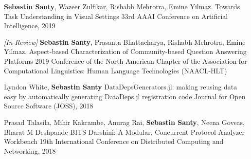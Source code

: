%
%
%


\begin{publications}
	\publication
	{\textbf{Sebastin Santy}, Wazeer Zulfikar, Rishabh Mehrotra, Emine Yilmaz.}
	{Towards Task Understanding in Visual Settings}
	{33rd AAAI Conference on Artificial Intelligence, 2019}
	
	\publication
	{\textit{[In-Review]} \textbf{Sebastin Santy}, Prasanta Bhattacharya, Rishabh Mehrotra, Emine Yilmaz.}
	{Aspect-based Characterization of Community-based Question Answering Platforms}
	{2019 Conference of the North American Chapter of the Association for Computational Linguistics: Human Language Technologies (NAACL-HLT)}
	
	\publication
	{Lyndon White, \textbf{Sebastin Santy}}
	{DataDepsGenerators.jl: making reusing data easy by automatically generating DataDeps.jl registration code}
	{Journal for Open Source Software (JOSS), 2018}
	
	\publication
	{Prasad Talasila, Mihir Kakrambe, Anurag Rai, \textbf{Sebastin Santy}, Neena Goveas, Bharat M Deshpande}
	{BITS Darshini: A Modular, Concurrent Protocol Analyzer Workbench}
	{19th International Conference on Distributed Computing and Networking, 2018}

\end{publications}
\vspace{-3mm}